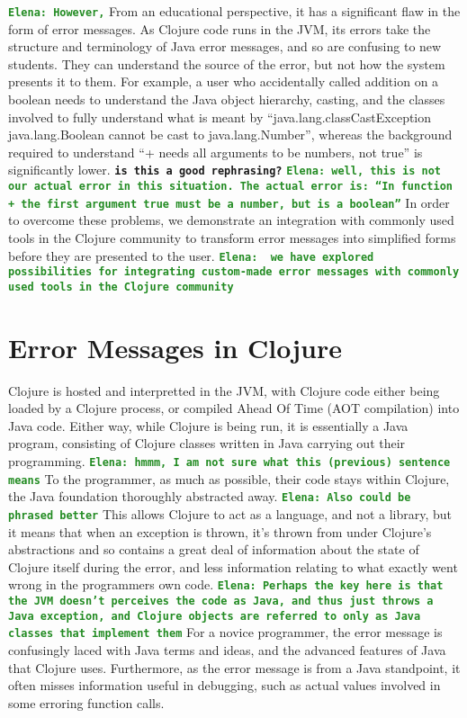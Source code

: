 \documentclass[12pt]{article}
\newcommand{\comment}[1]{{\bf \tt  {#1}}}
\newcommand{\emcomment}[1]{\textcolor{ForestGreen}{\comment{Elena: {#1}}}}
\begin{document}
\emcomment{However,} From an educational perspective, it has a significant flaw in the form of error messages.
As Clojure code runs in the JVM, its errors take the structure and terminology of Java error messages,
and so are confusing to new students. They can understand the source of the error,
but not how the system presents it to them.
For example, a user who accidentally called addition on a boolean needs
 to understand the Java object hierarchy, casting,
 and the classes involved to fully understand what is meant by
 ``java.lang.classCastException java.lang.Boolean cannot be cast to java.lang.Number'',
whereas the background required to understand ``+ needs all arguments to be numbers, not true''
 is significantly lower. \comment{is this a good rephrasing?} \emcomment{well, this is not our actual error in this situation. The actual error is:
``In function + the first argument true must be a number, but is a boolean''}
 In order to overcome these problems,
  we demonstrate an integration with commonly used tools in the Clojure community
 to transform error messages into simplified forms before they are presented to the user.
\emcomment{ we have explored possibilities for integrating custom-made error messages with commonly used tools in the Clojure community}




\section{Error Messages in Clojure}
Clojure is hosted and interpretted in the JVM, with Clojure code either being
loaded by a Clojure process, or compiled Ahead Of Time (AOT compilation) into Java code.
Either way, while Clojure is being run, it is essentially a Java program, consisting of
Clojure classes written in Java carrying out their programming.
\emcomment{hmmm, I am not sure what this (previous) sentence means}
To the programmer, as much as possible, their code stays within Clojure,
the Java foundation thoroughly abstracted away.
\emcomment{Also could be phrased better}
This allows Clojure to act as a language, and not a library, but it means
 that when an exception is thrown, it's thrown from under Clojure's abstractions
 and so contains a great deal of information about the state of Clojure itself
 during the error, and less information relating to what exactly went wrong in the
 programmers own code.
\emcomment{Perhaps the key here is that the JVM doesn't perceives the code as Java, and thus just throws a Java exception,
and Clojure objects are referred to only as Java classes that implement them}
 For a novice programmer, the error message is confusingly laced
  with Java terms and ideas, and the advanced features of Java that Clojure uses.
  Furthermore, as the error message is from a Java standpoint, it often misses
  information useful in debugging, such as actual values involved in some erroring function calls.
\end{document}
